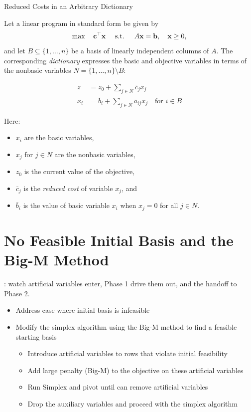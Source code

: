 \begin{definition}{Reduced Costs in an Arbitrary Dictionary}\label{def:reduced-cost-general}

Let a linear program in standard form be given by
\[
\max \quad \mathbf{c}^\top \mathbf{x} \quad \text{ s.t. } \quad A\mathbf{x} = \mathbf{b}, \quad \mathbf{x} \geq 0,
\]
and let \( B \subseteq \{1, \dots, n\} \) be a basis of linearly independent columns of \( A \). The corresponding \emph{dictionary} expresses the basic and objective variables in terms of the nonbasic variables \( N = \{1, \dots, n\} \setminus B \):

\[
\begin{aligned}
z &= z_0 + \sum_{j \in N} \bar{c}_j x_j \\
x_i &= \bar{b}_i + \sum_{j \in N} \bar{a}_{ij} x_j \quad \text{for } i \in B
\end{aligned}
\]

Here:
\begin{itemize}
    \item \( x_i \) are the basic variables,
    \item \( x_j \) for \( j \in N \) are the nonbasic variables,
    \item \( z_0 \) is the current value of the objective,
    \item \( \bar{c}_j \) is the \emph{reduced cost} of variable \( x_j \), and
    \item \( \bar{b}_i \) is the value of basic variable \( x_i \) when \( x_j = 0 \) for all \( j \in N \).
\end{itemize}
\end{definition}

\section{No Feasible Initial Basis and the Big-M Method}
\label{sec:big-m-dictionary}

\begin{tryit}
: watch artificial variables enter, Phase 1 drive them out, and the handoff to Phase 2.
\end{tryit}



\begin{outcome}
\begin{itemize}
\item Address case where initial basis is infeasible
\item Modify the simplex algorithm using the Big-M method to find a feasible starting basis
\begin{itemize}
\item Introduce artificial variables to rows that violate initial feasibility
\item Add large penalty (Big-M) to the objective on these artificial variables
\item Run Simplex and pivot until can remove artificial variables
\item Drop the auxiliary variables and proceed with the simplex algorithm
\end{itemize}
\end{itemize}
\end{outcome}


